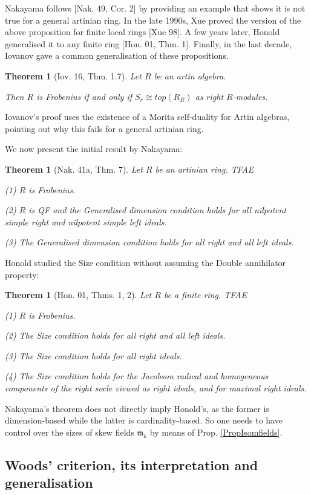 \documentclass[11pt]{article}
\theoremstyle{plain}
\newtheorem{Thm}[veta]{Theorem}
\theoremstyle{remark}
\theoremstyle{plain}
\newcommand{\m}{\mathfrak{m}}
\begin{document}
Nakayama follows [Nak. 49, Cor. 2] by providing an example that shows it is not true for a general artinian ring. In the late 1990s, Xue proved the version of the above proposition for finite local rings [Xue 98]. A few years later, Honold generalised it to any finite ring [Hon. 01,  Thm. 1]. Finally, in the last decade, Iovanov gave a common generalisation of these propositions.
\begin{Thm}[Iov. 16, Thm. 1.7]\label{ThmIovCyclic}
Let $R$ be an artin algebra.

Then $R$ is Frobenius if and only if $S_r\cong top(R_R)$ as right $R$-modules.    
\end{Thm}
Iovanov's proof uses the existence of a Morita self-duality for Artin algebras, pointing out why this fails for a general artinian ring.


We now present the initial result by Nakayama:
\begin{Thm}[Nak. 41a, Thm. 7] Let $R$ be an artinian ring. TFAE\label{ThmNakCard}

(1) $R$ is Frobenius. 

(2) $R$ is QF and the Generalised dimension condition holds for all nilpotent simple right and nilpotent simple left ideals.

(3) The Generalised dimension condition holds for all right and all left ideals.    
\end{Thm}
 Honold studied the Size condition without assuming the Double annihilator property:
\begin{Thm}[Hon. 01, Thms. 1, 2]\label{ThmHonCard}
Let $R$ be a finite ring. TFAE

(1) $R$ is Frobenius. 

(2) The Size condition holds for all right and all left ideals.        

(3) The Size condition holds for all right ideals.  

(4) The Size condition holds for the Jacobson radical and homogeneous components of the right socle viewed as right ideals, and for maximal right ideals.
\end{Thm}
 Nakayama's theorem does not directly imply Honold's, as the former is dimension-based while the latter is cardinality-based. So one needs to have control over the sizes of skew fields $\m_k$ by means of Prop. \ref{PropIsomfields}.




\subsection{Woods' criterion, its interpretation and generalisation}\label{SecCardWood}
\end{document}
